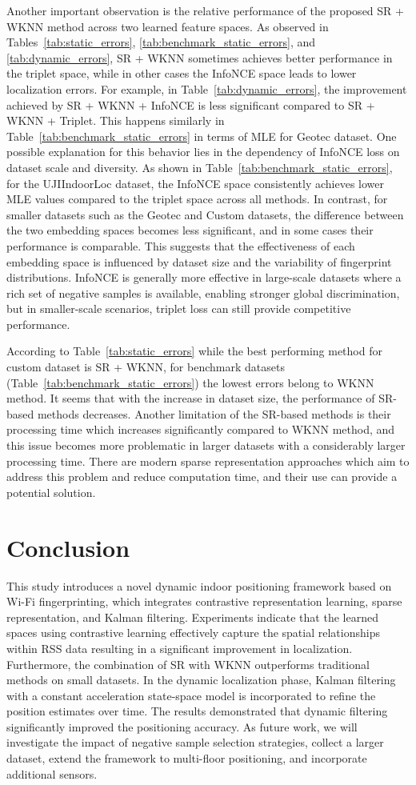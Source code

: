 \documentclass[journal,twoside,web]{ieeecolor}
\begin{document}
Another important observation is the relative performance of the proposed SR + WKNN method across two learned feature spaces. 
As observed in Tables~\ref{tab:static_errors}, \ref{tab:benchmark_static_errors}, and \ref{tab:dynamic_errors}, SR + WKNN sometimes achieves better performance in the triplet space, while in other cases the InfoNCE space leads to lower localization errors. 
For example, in Table~\ref{tab:dynamic_errors}, the improvement achieved by SR + WKNN + InfoNCE  is less significant compared to SR + WKNN + Triplet. This happens similarly in Table~\ref{tab:benchmark_static_errors}  in terms of MLE for Geotec dataset.
One possible explanation for this behavior lies in the dependency of InfoNCE loss on dataset scale and diversity. 
As shown in Table~\ref{tab:benchmark_static_errors}, for the UJIIndoorLoc dataset, the InfoNCE space consistently achieves lower MLE values compared to the triplet space across all methods. 
In contrast, for smaller datasets such as the Geotec and Custom datasets, the difference between the two embedding spaces becomes less significant, and in some cases their performance is comparable.
This suggests that the effectiveness of each embedding space is influenced by dataset size and the variability of fingerprint distributions. 
InfoNCE is generally more effective in large-scale datasets where a rich set of negative samples is available, enabling stronger global discrimination, but in smaller-scale scenarios, triplet loss can still provide competitive performance.

According to Table~\ref{tab:static_errors} while the best performing method for custom dataset is SR + WKNN, for benchmark datasets (Table~\ref{tab:benchmark_static_errors}) 
the lowest errors belong to WKNN method.
It seems that with the increase in dataset size, the performance of SR-based methods decreases. Another limitation of the SR-based methods is their processing time which increases significantly compared to WKNN method, and this issue becomes more problematic in larger datasets with a considerably larger processing time. There are modern sparse representation approaches which aim to address this problem and reduce computation time, and their use can provide a potential solution.
\section{Conclusion }
This study introduces a novel dynamic indoor positioning framework based on Wi-Fi fingerprinting, which integrates contrastive representation learning, sparse representation, and Kalman filtering.
Experiments indicate that the learned spaces using contrastive learning effectively capture the spatial relationships within RSS data resulting in a significant improvement in localization.
Furthermore, the combination of SR with WKNN outperforms traditional methods on small datasets.
In the dynamic localization phase, Kalman filtering with a constant acceleration state-space model is incorporated to refine the position estimates over time. The results demonstrated that dynamic filtering significantly improved the positioning accuracy.
As future work, we will investigate the impact of negative sample selection strategies, collect a larger dataset, extend the framework to multi-floor positioning, and incorporate additional sensors.
\appendices
\end{document}
